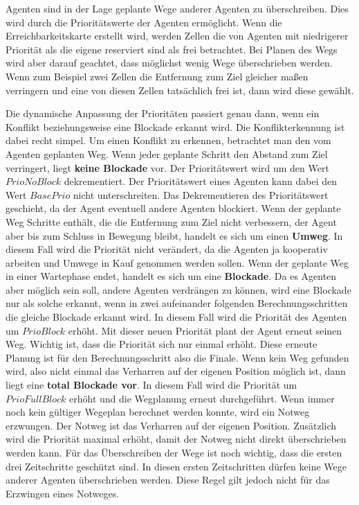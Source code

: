 Agenten sind in der Lage geplante Wege anderer Agenten zu überschreiben. Dies wird durch die Prioritätswerte der Agenten ermöglicht. Wenn die Erreichbarkeitskarte erstellt wird, werden Zellen die von Agenten mit niedrigerer Priorität als die eigene reserviert sind als frei betrachtet. Bei Planen des Wegs wird aber darauf geachtet, dass möglichst wenig Wege überschrieben werden. Wenn zum Beispiel zwei Zellen die Entfernung zum Ziel gleicher maßen verringern und eine von diesen Zellen tatsächlich frei ist, dann wird diese gewählt. \cite{book:regele}

Die dynamische Anpassung der Prioritäten passiert genau dann, wenn ein Konflikt beziehungsweise eine Blockade erkannt wird. Die Konflikterkennung ist dabei recht simpel. Um einen Konflikt zu erkennen, betrachtet man den vom Agenten geplanten Weg. Wenn jeder geplante Schritt den Abstand zum Ziel verringert, liegt \textbf{keine Blockade} vor. Der Prioritätswert wird um den Wert \(PrioNoBlock\) dekrementiert. Der Prioritätswert eines Agenten kann dabei den Wert \(BasePrio\) nicht unterschreiten. Das Dekrementieren des Prioritätswert geschieht, da der Agent eventuell andere Agenten blockiert. Wenn der geplante Weg Schritte enthält, die die Entfernung zum Ziel nicht verbessern, der Agent aber bis zum Schluss in Bewegung bleibt, handelt es sich um einen \textbf{Umweg}. In diesem Fall wird die Priorität nicht verändert, da die Agenten ja kooperativ arbeiten und Umwege in Kauf genommen werden sollen. Wenn der geplante Weg in einer Wartephase endet, handelt es sich um eine \textbf{Blockade}. Da es Agenten aber möglich sein soll, andere Agenten verdrängen zu können, wird eine Blockade nur als solche erkannt, wenn in zwei aufeinander folgenden Berechnungsschritten die gleiche Blockade erkannt wird. In diesem Fall wird die Priorität des Agenten um \(PrioBlock\) erhöht. Mit dieser neuen Priorität plant der Agent erneut seinen Weg. Wichtig ist, dass die Priorität sich nur einmal erhöht. Diese erneute Planung ist für den Berechnungsschritt also die Finale. Wenn kein Weg gefunden wird, also nicht einmal das Verharren auf der eigenen Position möglich ist, dann liegt eine \textbf{total Blockade vor}. In diesem Fall wird die Priorität um \(PrioFullBlock\) erhöht und die Wegplanung erneut durchgeführt. Wenn immer noch kein gültiger Wegeplan berechnet werden konnte, wird ein Notweg erzwungen. Der Notweg ist das Verharren auf der eigenen Position. Zusätzlich wird die Priorität maximal erhöht, damit der Notweg nicht direkt überschrieben werden kann. Für das Überschreiben der Wege ist noch wichtig, dass die ersten drei Zeitschritte geschützt sind. In diesen ersten Zeitschritten dürfen keine Wege anderer Agenten überschrieben werden. Diese Regel gilt jedoch nicht für das Erzwingen eines Notweges. \cite{book:regele}


